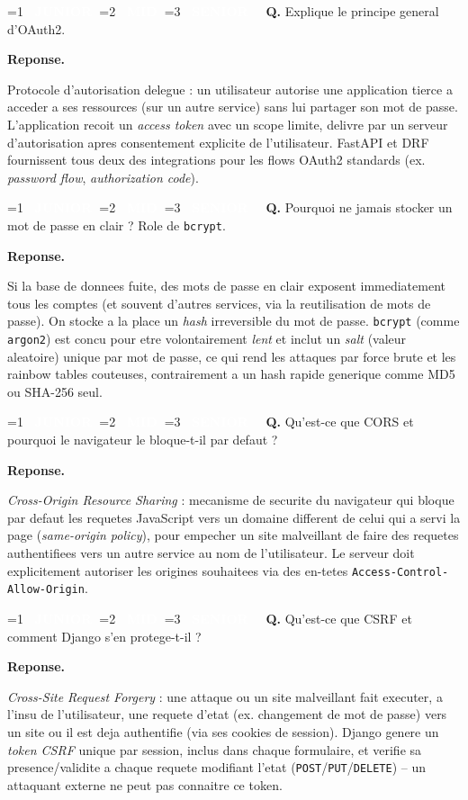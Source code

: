 \documentclass[11pt,a4paper]{article}
\newcommand{\badgeJ}{\textcolor{white}{\colorbox{junior}{\small\bfseries\ JUNIOR\ }}}
\newcommand{\badgeM}{\textcolor{white}{\colorbox{mid}{\small\bfseries\ MID\ }}}
\newcommand{\badgeS}{\textcolor{white}{\colorbox{senior}{\small\bfseries\ SENIOR\ }}}
\newcounter{qcount}
\newenvironment{qa}[2]{%
  \stepcounter{qcount}%
  \par\vspace{6pt}%
  \noindent\colorbox{qbg}{\parbox{\dimexpr\linewidth-12pt}{\vspace{2pt}%
  \ifnum#1=1 \badgeJ\fi\ifnum#1=2 \badgeM\fi\ifnum#1=3 \badgeS\fi
  \ \textbf{Q\theqcount.} #2\vspace{2pt}}}\par\vspace{4pt}%
  \noindent\textbf{\color{accent}Reponse.}\ \ignorespaces
}{%
  \par\vspace{8pt}%
}
\begin{document}
\begin{qa}{2}{Explique le principe general d'OAuth2.}
Protocole d'autorisation delegue : un utilisateur autorise une application
tierce a acceder a ses ressources (sur un autre service) sans lui partager
son mot de passe. L'application recoit un \emph{access token} avec un scope
limite, delivre par un serveur d'autorisation apres consentement explicite de
l'utilisateur. FastAPI et DRF fournissent tous deux des integrations pour les
flows OAuth2 standards (ex. \emph{password flow}, \emph{authorization code}).
\end{qa}

\begin{qa}{1}{Pourquoi ne jamais stocker un mot de passe en clair ? Role de \texttt{bcrypt}.}
Si la base de donnees fuite, des mots de passe en clair exposent
immediatement tous les comptes (et souvent d'autres services, via la
reutilisation de mots de passe). On stocke a la place un \emph{hash}
irreversible du mot de passe. \texttt{bcrypt} (comme \texttt{argon2}) est
concu pour etre volontairement \emph{lent} et inclut un \emph{salt} (valeur
aleatoire) unique par mot de passe, ce qui rend les attaques par force brute
et les rainbow tables couteuses, contrairement a un hash rapide generique
comme MD5 ou SHA-256 seul.
\end{qa}

\begin{qa}{2}{Qu'est-ce que CORS et pourquoi le navigateur le bloque-t-il par defaut ?}
\emph{Cross-Origin Resource Sharing} : mecanisme de securite du navigateur qui
bloque par defaut les requetes JavaScript vers un domaine different de celui
qui a servi la page (\emph{same-origin policy}), pour empecher un site
malveillant de faire des requetes authentifiees vers un autre service au nom
de l'utilisateur. Le serveur doit explicitement autoriser les origines
souhaitees via des en-tetes \texttt{Access-Control-Allow-Origin}.
\end{qa}

\begin{qa}{2}{Qu'est-ce que CSRF et comment Django s'en protege-t-il ?}
\emph{Cross-Site Request Forgery} : une attaque ou un site malveillant fait
executer, a l'insu de l'utilisateur, une requete d'etat (ex. changement de
mot de passe) vers un site ou il est deja authentifie (via ses cookies de
session). Django genere un \emph{token CSRF} unique par session, inclus dans
chaque formulaire, et verifie sa presence/validite a chaque requete modifiant
l'etat (\texttt{POST}/\texttt{PUT}/\texttt{DELETE}) -- un attaquant externe ne
peut pas connaitre ce token.
\end{qa}
\end{document}
